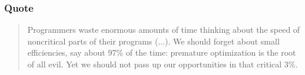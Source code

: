 \documentclass{beamer}
\begin{document}
    \begin{frame}
        \frametitle{Quote}
        \begin{quote}
            Programmers waste enormous amounts of time thinking
            about the speed of noncritical parts of their programs (...). We
            should forget about small efficiencies, say about 97\% of the
            time: premature optimization is the root of all evil. Yet we
            should not pass up our opportunities in that critical 3\%.
        \end{quote}
        \hspace*{}
    \end{frame}
\end{document}
